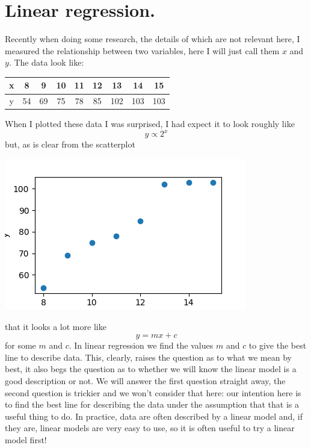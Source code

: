 \documentclass[12pt]{article}
\begin{document}
\section*{Linear regression.} 

Recently when doing some research, the details of which are not
relevant here, I measured the relationship between two variables, here
I will just call them $x$ and $y$. The data look like:
\begin{center}
\begin{tabular}{@{}ccccccccc@{}}
\toprule
x & 8 & 9 & 10 & 11 & 12 & 13 & 14 & 15 \\ \midrule
y & 54 & 69 & 75 & 78 & 85 & 102 & 103 & 103 \\ \bottomrule
\end{tabular}
\end{center}
When I plotted these data I was surprised, I had expect it to look
roughly like
\begin{equation}
  y\propto 2^x
\end{equation}
but, as is clear from the scatterplot
\begin{center}
  \includegraphics[]{02.3_points.png}
  \end{center}
that it looks a lot more like
\begin{equation}
  y=mx+c
\end{equation}
for some $m$ and $c$. In linear regression we find the values $m$ and
$c$ to give the best line to describe data. This, clearly, raises the
question as to what we mean by best, it also begs the question as to
whether we will know the linear model is a good description or not. We
will answer the first question straight away, the second question is
trickier and we won't consider that here: our intention here is to
find the best line for describing the data under the assumption that
that is a useful thing to do. In practice, data are often described by
a linear model and, if they are, linear models are very easy to use,
so it is often useful to try a linear model first!
\end{document}
